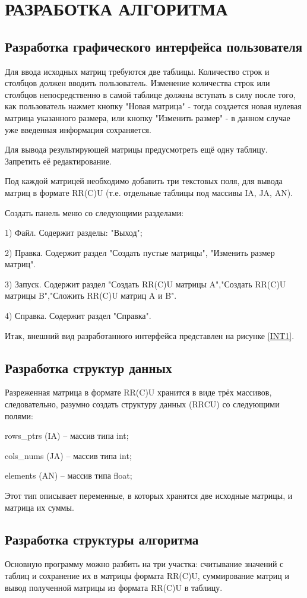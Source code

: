 \section{РАЗРАБОТКА АЛГОРИТМА}
\subsection{Разработка графического интерфейса пользователя}
Для ввода исходных матриц требуются две таблицы. Количество строк и столбцов должен вводить пользователь. Изменение количества строк или столбцов непосредственно в самой таблице должны вступать в силу после того, как пользователь нажмет кнопку "Новая матрица" - тогда создается новая нулевая матрица указанного размера, или кнопку "Изменить размер" - в данном случае уже введенная информация сохраняется.

Для вывода результирующей матрицы предусмотреть ещё одну таблицу. Запретить её редактирование.

Под каждой матрицей необходимо добавить три текстовых поля, для вывода матриц в формате RR(C)U (т.е. отдельные таблицы под массивы IA, JA, AN).

Создать панель меню со следующими разделами:

1)	Файл. Содержит разделы: "Выход";

2)	Правка. Содержит раздел "Создать пустые матрицы", "Изменить размер матриц".

3)	Запуск. Содержит раздел "Создать RR(C)U матрицы A","Создать RR(C)U матрицы B","Сложить RR(C)U матриц A и B".

4)  Справка. Содержит раздел "Справка".

Итак, внешний вид разработанного интерфейса представлен на рисунке \ref{INT1}.
\subsection{Разработка структур данных}
Разреженная матрица в формате RR(C)U хранится в виде трёх массивов, следовательно, разумно создать структуру данных (RRCU) со следующими полями:

rows\_ptrs (IA) – массив типа int;

cols\_nums (JA) – массив типа int;

elements (AN) – массив типа float;

Этот тип описывает переменные, в которых хранятся две исходные матрицы, и матрица их суммы.
\subsection{Разработка структуры алгоритма}
Основную программу можно разбить на три участка: считывание значений с таблиц и сохранение их в матрицы формата RR(C)U, суммирование матриц и вывод полученной матрицы из формата RR(C)U в таблицу.

